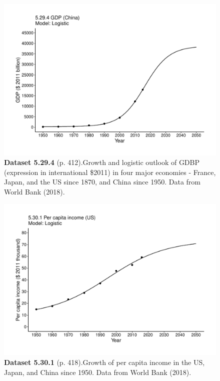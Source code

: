\documentclass[aps,rmp,preprint,superscriptaddress,10pt,onecolumn]{article}
\begin{document}
\clearpage
\begin{figure}[h]
\includegraphics[width=\textwidth]{output/figs-ggplot/5.29.4.pdf}
\caption*{\textbf{Dataset 5.29.4} (p. 412).Growth and logistic outlook of GDBP (expression in international \$2011) in four major economies - France, Japan, and the US since 1870, and China since 1950. Data from World Bank (2018).}
\end{figure}
	
\clearpage
\begin{figure}[h]
\includegraphics[width=\textwidth]{output/figs-ggplot/5.30.1.pdf}
\caption*{\textbf{Dataset 5.30.1} (p. 418).Growth of per capita income in the US, Japan, and China since 1950. Data from World Bank (2018).}
\end{figure}
	
\end{document}
